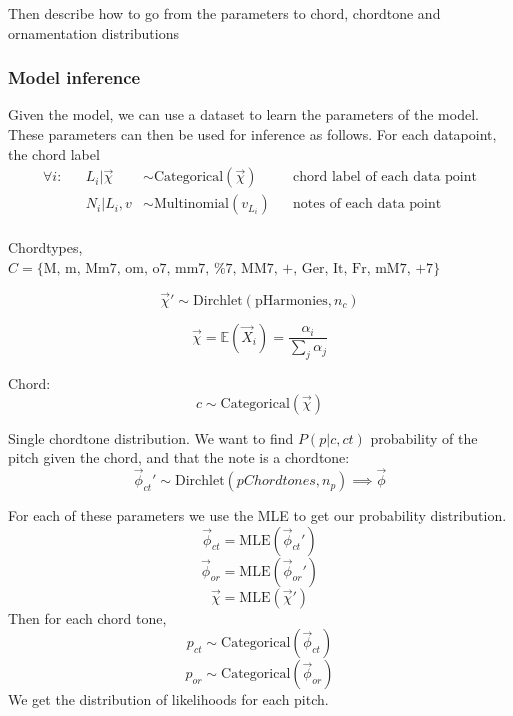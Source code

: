 \documentclass[12pt,a4paper,twoside,openright]{report}
\theoremstyle{definition}
\begin{document}
\par
Then describe how to go from the parameters to chord, chordtone and ornamentation distributions
\par

\subsubsection{Model inference}
Given the model, we can use a dataset to learn the parameters of the model. These parameters can then be used for inference as follows.
For each datapoint, the chord label 
\begin{equation}
\begin{align*} 
  \forall i:  && L_i | \vec{\chi} &\sim \text{Categorical}(\vec{\chi}) && \text{chord label of each data point} \\
              && N_i | L_i, v &\sim \text{Multinomial}(v_{L_i})  && \text{notes of each data point} \\
\end{align*}
\label{eq:chordlabeldp}
\end{equation}

\par
Chordtypes, $C = \{\text{M,~m, Mm7, om, o7, mm7, \%7, MM7, +, Ger, It, Fr, mM7, +7}\}$

\[\vec{\chi}' \sim \text{Dirchlet} (\text{pHarmonies}, n_c) \]

\[\vec{\chi} = \mathbb{E} (\vec{X}_i) = \frac{\alpha_i}{\sum\limits_j \alpha_j} \]

Chord: \[c \sim \text{Categorical}(\vec{\chi})\]

Single chordtone distribution. We want to find $P(p|c, ct)$ probability of the pitch given the chord, and that the note is a chordtone:
\[\vec{\phi}_{ct}' \sim \text{Dirchlet}(pChordtones, n_p) \implies \vec{\phi}\]

For each of these parameters we use the MLE to get our probability distribution. 
\[\vec{\phi}_{ct} = \text{MLE} (\vec{\phi}_{ct}')\]
\[\vec{\phi}_{or} = \text{MLE} (\vec{\phi}_{or}')\]
\[\vec{\chi}= \text{MLE} (\vec{\chi}') \]
Then for each chord tone,
\[p_{ct} \sim \text{Categorical}(\vec{\phi}_{ct})\]
\[p_{or} \sim \text{Categorical}(\vec{\phi}_{or})\]
We get the distribution of likelihoods for each pitch.
\end{document}
